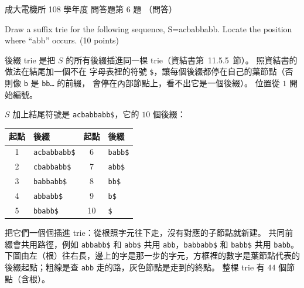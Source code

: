 \begin{pastexam}[label={px:ncku-108-ee-ds-07}]{成大電機所 108 學年度 問答題第 6 題}
（問答）

Draw a suffix trie for the following sequence, S=acbabbabb. Locate the position where ``abb''
occurs. (10 points)
\end{pastexam}

\begin{pastsoln}
後綴 trie 是把 $S$ 的所有後綴插進同一棵 trie（資結書第~11.5.5~節）。 照資結書的做法在結尾加一個不在
字母表裡的符號 \texttt{\$}，讓每個後綴都停在自己的葉節點（否則像 \texttt{b} 是 \texttt{bb\ldots} 的前綴，
會停在內部節點上，看不出它是一個後綴）。 位置從 $1$ 開始編號。

$S$ 加上結尾符號是 \texttt{acbabbabb\$}，它的 $10$ 個後綴：
\begin{center}
\small
\begin{tabular}{cl@{\qquad}cl}
\toprule
起點 & 後綴 & 起點 & 後綴 \\
\midrule
1 & \texttt{acbabbabb\$} & 6 & \texttt{babb\$} \\
2 & \texttt{cbabbabb\$} & 7 & \texttt{abb\$} \\
3 & \texttt{babbabb\$} & 8 & \texttt{bb\$} \\
4 & \texttt{abbabb\$} & 9 & \texttt{b\$} \\
5 & \texttt{bbabb\$} & 10 & \texttt{\$} \\
\bottomrule
\end{tabular}
\end{center}

把它們一個個插進 trie：從根照字元往下走，沒有對應的子節點就新建。 共同前綴會共用路徑，例如
\texttt{abbabb\$} 和 \texttt{abb\$} 共用 \texttt{abb}，\texttt{babbabb\$} 和 \texttt{babb\$} 共用 \texttt{babb}。
下圖由左（根）往右長，邊上的字是那一步的字元，方框裡的數字是葉節點代表的後綴起點；粗線是查
\texttt{abb} 走的路，灰色節點是走到的終點。 整棵 trie 有 $44$ 個節點（含根）。


\end{pastsoln}
